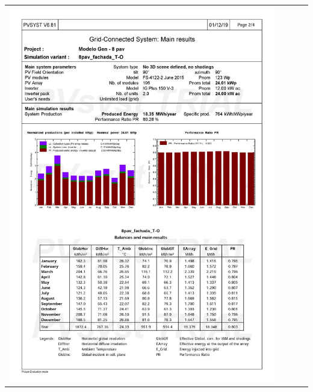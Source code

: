 \begin{table}[H]
    \centering
    \begin{tabular}{l}
        \includegraphics[width=0.9\textwidth]{figures/attachments/resultpv14.jpg}
    \end{tabular}
\end{table}
\pagebreak
